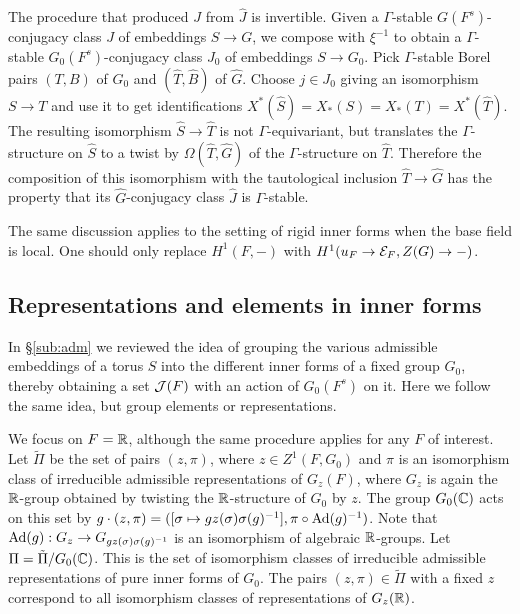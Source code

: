 \documentclass{article}
\theoremstyle{definition}
\numberwithin{equation}{section}
\renewcommand{\-}{\hyp{}}
\begin{document}
The procedure that produced $J$ from $\hat J$ is invertible. Given a $\Gamma$-stable $G(F^s)$-conjugacy class $J$ of embeddings $S \to G$, we compose with $\xi^{-1}$ to obtain a $\Gamma$-stable $G_0(F^s)$-conjugacy class $J_0$ of embeddings $S \to G_0$. Pick $\Gamma$-stable Borel pairs $(T,B)$ of $G_0$ and $(\hat T,\hat B)$ of $\hat G$. Choose $j \in J_0$ giving an isomorphism $S \to T$ and use it to get identifications $X^*(\hat S)=X_*(S)=X_*(T)=X^*(\hat T)$. The resulting isomorphism $\hat S \to \hat T$ is not $\Gamma$-equivariant, but translates the $\Gamma$-structure on $\hat S$ to a twist by $\Omega(\hat T,\hat G)$ of the $\Gamma$-structure on $\hat T$. Therefore the composition of this isomorphism with the tautological inclusion $\hat T \to \hat G$ has the property that its $\hat G$-conjugacy class $\hat J$ is $\Gamma$-stable. 


The same discussion applies to the setting of rigid inner forms when the base field is local. One should only replace $H^1(F,-)$ with $H^1(u_F \to \mathcal{E}_F,Z(G) \to -)$.

\subsection{Representations and elements in inner forms} \label{sub:across}

In \S\ref{sub:adm} we reviewed the idea of grouping the various admissible embeddings of a torus $S$ into the different inner forms of a fixed group $G_0$, thereby obtaining a set $\mathcal{J}(F)$ with an action of $G_0(F^s)$ on it. Here we follow the same idea, but group elements or representations. 

We focus on $F=\mathbb{R}$, although the same procedure applies for any $F$ of interest. Let $\tilde\Pi$ be the set of pairs $(z,\pi)$, where $z \in Z^1(F,G_0)$ and $\pi$ is an isomorphism class of irreducible admissible representations of $G_z(F)$, where $G_z$ is again the $\mathbb{R}$-group obtained by twisting the $\mathbb{R}$-structure of $G_0$ by $z$. The group $G_0(\mathbb{C})$ acts on this set by $g\cdot (z,\pi) = ([\sigma \mapsto gz(\sigma)\sigma(g)^{-1}],\pi \circ\textrm{Ad}(g)^{-1})$. Note that $\textrm{Ad}(g) : G_z \to G_{gz(\sigma)\sigma(g)^{-1}}$ is an isomorphism of algebraic $\mathbb{R}$-groups. Let $\Pi=\tilde\Pi/G_0(\mathbb{C})$. This is the set of isomorphism classes of irreducible admissible representations of pure inner forms of $G_0$. The pairs $(z,\pi) \in \tilde\Pi$ with a fixed $z$ correspond to all isomorphism classes of representations of $G_z(\mathbb{R})$.
\end{document}
